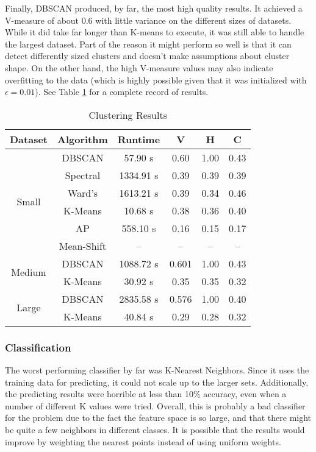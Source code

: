 \documentclass[letterpaper,10pt]{article}
\begin{document}
Finally, DBSCAN produced, by far, the most high quality results. It
achieved a V-measure of about 0.6 with little variance on the different
sizes of datasets. While it did take far longer than K-means to execute, it
was still able to handle the largest dataset. Part of the reason it might
perform so well is that it can detect differently sized clusters and
doesn't make assumptions about cluster shape. On the other hand, the high
V-measure values may also indicate overfitting to the data (which is highly
possible given that it was initialized with $\epsilon=0.01$). See Table
\ref{tbl:clustering} for a complete record of results.


\begin{table}[ht]
\center
\begin{tabular}{cccccc}
Dataset & Algorithm & Runtime & \textbf{V} & \textbf{H} & \textbf{C} \\
\hline
\multicolumn{1}{c}{\multirow{6}{*}{Small}}
      & DBSCAN & 57.90 s & 0.60 & 1.00 & 0.43 \\
      & Spectral & 1334.91 s & 0.39 & 0.39 & 0.39 \\
      & Ward's & 1613.21 s & 0.39 & 0.34 & 0.46 \\
      & K-Means & 10.68 s & 0.38 & 0.36 & 0.40 \\
      & AP & 558.10 s & 0.16 & 0.15 & 0.17 \\
      & Mean-Shift & -- & -- & -- & -- \\
\hline
\multicolumn{1}{c}{\multirow{2}{*}{Medium}}
      & DBSCAN & 1088.72 s & 0.601 & 1.00 & 0.43 \\
      & K-Means & 30.92 s & 0.35 & 0.35 & 0.32 \\
\hline
\multicolumn{1}{c}{\multirow{2}{*}{Large}}
      & DBSCAN & 2835.58 s & 0.576 & 1.00 & 0.40 \\
      & K-Means & 40.84 s & 0.29 & 0.28 & 0.32 \\
\hline
\end{tabular}
\caption{Clustering Results}
\label{tbl:clustering}
\end{table}


\subsubsection{Classification}

The worst performing classifier by far was K-Nearest Neighbors. Since it
uses the training data for predicting, it could not scale up to the larger
sets.  Additionally, the predicting results were horrible at less than 10\%
accuracy, even when a number of different K values were tried. Overall,
this is probably a bad classifier for the problem due to the fact the
feature space is so large, and that there might be quite a few neighbors in
different classes. It is possible that the results would improve by
weighting the nearest points instead of using uniform weights.
\end{document}
